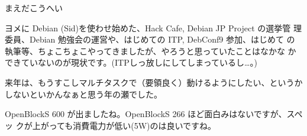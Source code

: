 \begin{prework}{まえだこうへい}

ヨメに Debian (Sid)を使わせ始めた、Hack Cafe, Debian JP Project の選挙管
 理委員、Debian 勉強会の運営や、はじめての ITP, DebConf9 参加、はじめて
 の執筆等、ちょこちょこやってきましたが、やろうと思っていたことはなかな
 かできていないのが現状です。(ITPしっ放しにしてしまっているし…。)

来年は、もうすこしマルチタスクで（要領良く）動けるようにしたい、というか
しないといかんなぁと思う年の瀬でした。


OpenBlockS 600 が出ましたね。OpenBlockS 266 ほど面白みはないですが、スペッ
 クが上がっても消費電力が低い(5W)のは良いですね。
\end{prework}

